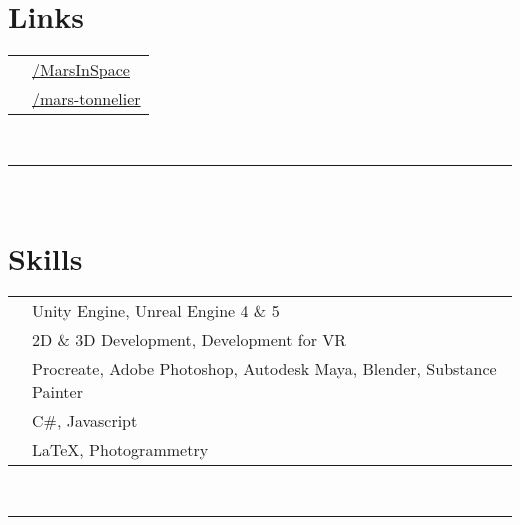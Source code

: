 \documentclass[oneside]{article}
\begin{document}
{\begin{minipage}[t][\textheight-2\fboxsep-2\fboxrule][t]{\dimexpr0.40\textwidth-2\fboxrule-2\fboxsep\relax}
        \section*{\large Links}
        \begin{tabular}{cl}
            \faGithub{}   & \href{https://github.com/MarsInSpace}{/MarsInSpace} \\
            \faLinkedin{} & \href{https://www.linkedin.com/in/mars-tonnelier/}{/mars-tonnelier} \\
        \end{tabular}
        \vspace{10pt} \\
        \rule{\linewidth}{0.4pt} \\
        \section*{\large Skills}
        \begin{tabularx}{\textwidth}{cY}
            \faCogs{}        & Unity Engine, Unreal Engine 4 \& 5 \\
            \faGamepad{}     & 2D \& 3D Development, Development for VR \\
            \faPalette{}     & Procreate, Adobe Photoshop, Autodesk Maya, Blender, Substance Painter \\
            \faCode{}        & C\#, Javascript \\
            \faToolbox{}     & \LaTeX, Photogrammetry \\
        \end{tabularx}
        \vspace{1pt} \\
        \rule{\linewidth}{0.4pt}

\end{minipage}}
\end{document}
